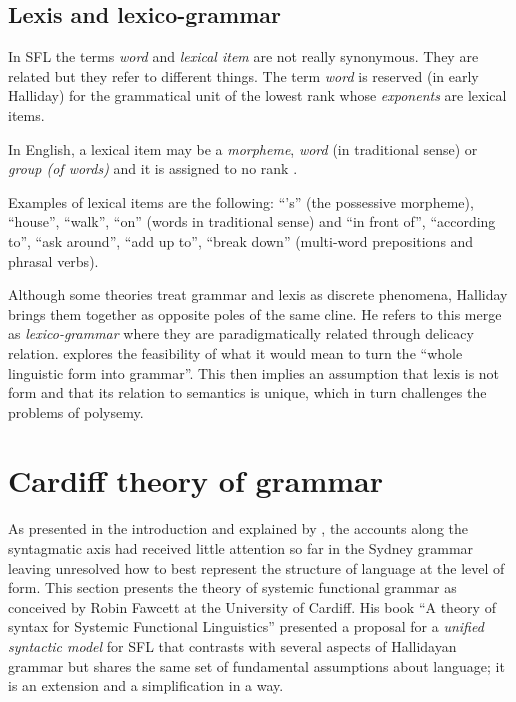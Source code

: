 \subsection{Lexis and lexico-grammar}
In SFL the terms \textit{word} and \textit{lexical item} are not really synonymous. They are related but they refer to different things. The term \textit{word} is reserved (in early Halliday) for the grammatical unit of the lowest rank whose \textit{exponents} are lexical items. %

\begin{definition}\label{def:lexical-item}
	In English, a lexical item may be a \textit{morpheme}, \textit{word} (in traditional sense) or \textit{group (of words)} and it is assigned to no rank \citep[60]{Halliday2002}.
\end{definition}

Examples of lexical items are the following: ``'s'' (the possessive morpheme), ``house'', ``walk'', ``on'' (words in traditional sense) and ``in front of'', ``according to'', ``ask around'', ``add up to'', ``break down'' (multi-word prepositions and phrasal verbs).

Although some theories treat grammar and lexis as discrete phenomena, Halliday brings them together as opposite poles of the same cline. He refers to this merge as \textit{lexico-grammar} where they are paradigmatically related through delicacy relation.
\citet{Hasan2014} explores the feasibility of what it would mean to turn the ``whole linguistic form into grammar''. This then implies an assumption that lexis is not form and that its relation to semantics is unique, which  in turn challenges the problems of polysemy. 


\section{Cardiff theory of grammar}
\label{sec:cardiff-theory-grammar}
As presented in the introduction and explained by \citet{Bateman2008}, the accounts along the syntagmatic axis had received little attention so far in the Sydney grammar leaving unresolved how to best represent the structure of language at the level of form. This section presents the theory of systemic functional grammar as conceived by Robin Fawcett at the University of Cardiff. His book ``A theory of syntax for Systemic Functional Linguistics'' \citep{Fawcett2000} presented a proposal for a \textit{unified syntactic model} for SFL that contrasts with several aspects of Hallidayan grammar but shares the same set of fundamental assumptions about language; it is an extension and a simplification in a way.

